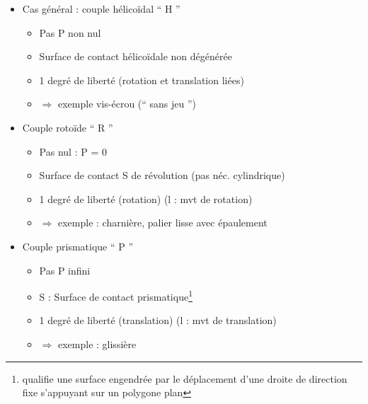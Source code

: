 \begin{itemize}
\renewcommand{\labelitemi}{$\circ$}
\renewcommand{\labelitemii}{$\cdot$}
\item{Cas général : {\color{orange}couple hélicoïdal “ H ”}}
\begin{itemize}
\item{Pas P non nul}
\item{Surface de contact hélicoïdale non dégénérée}
\item{1 degré de liberté (rotation et translation liées)}
\item{$\Rightarrow$ exemple vis-écrou (“ sans jeu ”)}
\end{itemize}
\item{{\color{orange}Couple rotoïde “ R ”}}
\begin{itemize}
\item{Pas nul : P = 0}
\item{Surface de contact S de révolution (pas néc. cylindrique)}
\item{1 degré de liberté (rotation) (l : mvt de rotation)}
\item{$\Rightarrow$ exemple : charnière, palier lisse avec épaulement}
\end{itemize}
\item{{\color{orange}Couple prismatique “ P ”}}
\begin{itemize}
\item{Pas P infini }
\item{S : Surface de contact prismatique\footnote{qualifie une surface engendrée par le déplacement d’une droite de direction fixe s’appuyant sur un polygone plan}}
\item{1 degré de liberté (translation) (l : mvt de translation)}
\item{$\Rightarrow$ exemple : glissière}\\
\end{itemize}
\end{itemize}

